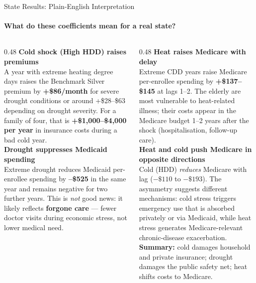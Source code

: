 \documentclass[aspectratio=169,11pt]{beamer}
\newcommand{\emphcolor}[1]{{\color{WarmOrange}\textbf{#1}}}
\newcommand{\tealtext}[1]{{\color{Teal}#1}}
\newcommand{\graytext}[1]{{\color{WarmGray}#1}}
\begin{document}
\begin{frame}[shrink=18]{State Results: Plain-English Interpretation}
  \framesubtitle{What do these coefficients mean for a real state?}
  \begin{columns}[T]
    \begin{column}{0.48\textwidth}
      \textbf{\tealtext{Cold shock (High HDD) raises premiums}}\\[0.2em]
      \footnotesize
      A year with extreme heating degree days raises the Benchmark Silver premium by \emphcolor{+\$86/month} for severe drought conditions or around +\$28--\$63 depending on drought severity. For a family of four, that is \emphcolor{+\$1,000--\$4,000 per year} in insurance costs during a bad cold year.\\[0.4em]
      \textbf{\tealtext{Drought suppresses Medicaid spending}}\\[0.2em]
      Extreme drought reduces Medicaid per-enrollee spending by \emphcolor{--\$525} in the same year and remains negative for two further years. This is \emph{not} good news: it likely reflects \emphcolor{forgone care} --- fewer doctor visits during economic stress, not lower medical need.
    \end{column}
    \begin{column}{0.48\textwidth}
      \textbf{\tealtext{Heat raises Medicare with delay}}\\[0.2em]
      \footnotesize
      Extreme CDD years raise Medicare per-enrollee spending by \emphcolor{+\$137--\$145} at lags 1--2. The elderly are most vulnerable to heat-related illness; their costs appear in the Medicare budget 1--2 years after the shock (hospitalisation, follow-up care).\\[0.4em]
      \textbf{\tealtext{Heat and cold push Medicare in opposite directions}}\\[0.2em]
      Cold (HDD) \emph{reduces} Medicare with lag ($-\$110$ to $-\$193$). The asymmetry suggests different mechanisms: cold stress triggers emergency use that is absorbed privately or via Medicaid, while heat stress generates Medicare-relevant chronic-disease exacerbation.\\[0.3em]
      \graytext{\scriptsize \textbf{Summary:} cold damages household and private insurance; drought damages the public safety net; heat shifts costs to Medicare.}
    \end{column}
  \end{columns}
\end{frame}
\end{document}
